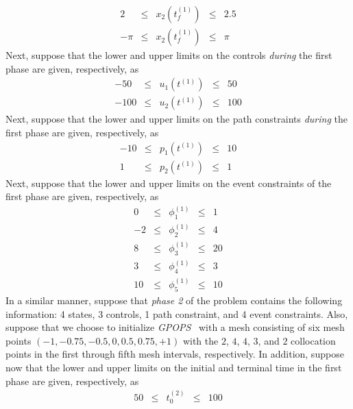 \documentclass[10pt]{article}
\newcommand{\gpops}{{\em GPOPS}~}
\newenvironment{shadedframe}{%
  \def\FrameCommand{\fcolorbox{black}{shadecolor}}%
  \MakeFramed {\FrameRestore}}
{\endMakeFramed}
\begin{document}
\begin{shadedframe}
\begin{displaymath}
\begin{array}{rcccr}
   2 & \leq & x_2(t_f^{(1)}) & \leq & 2.5 \\
   -\pi & \leq & x_2(t_f^{(1)}) & \leq & \pi
 \end{array}
\end{displaymath}
Next, suppose that the lower and upper limits on the controls
{\em during} the first phase are given, respectively, as
\begin{displaymath}
 \begin{array}{rcccr}
   -50 & \leq & u_1(t^{(1)}) & \leq & 50 \\
   -100 & \leq & u_2(t^{(1)})& \leq & 100
 \end{array}
\end{displaymath}
Next, suppose that the lower and upper limits on the path constraints
{\em during} the first phase are given, respectively, as
\begin{displaymath}
 \begin{array}{rcccr}
   -10 & \leq & p_1(t^{(1)}) & \leq & 10 \\
    1 & \leq & p_2(t^{(1)})& \leq & 1
 \end{array}
\end{displaymath}
Next, suppose that the lower and upper limits on the event constraints
of the first phase are given, respectively, as
\begin{displaymath}
 \begin{array}{rcccr}
   0 & \leq & \phi_1^{(1)} & \leq & 1 \\
    -2 & \leq & \phi_2^{(1)} & \leq & 4 \\
   8 & \leq & \phi_3^{(1)} & \leq & 20 \\
   3 & \leq & \phi_4^{(1)} & \leq & 3 \\
   10 & \leq & \phi_5^{(1)} & \leq & 10
 \end{array}
\end{displaymath}
In a similar manner, suppose that {\em phase 2} of the problem
contains the following information:  4 states, 3 controls, 1 path constraint, and 4
event constraints.  Also, suppose that we choose to initialize \gpops
with a mesh consisting of six mesh points
$(-1,-0.75,-0.5,0,0.5,0.75,+1)$ with the $2$, $4$, $4$, $3$, and $2$
collocation points in the first through fifth mesh intervals,
respectively.  In addition, suppose now that the
lower and upper limits on the initial and terminal time in the first
phase are given, respectively, as
\begin{displaymath}
 \begin{array}{rcccr}
   50 & \leq  & t_0^{(2)} & \leq & 100 \\

\end{array}
\end{displaymath}
\end{shadedframe}
\end{document}
